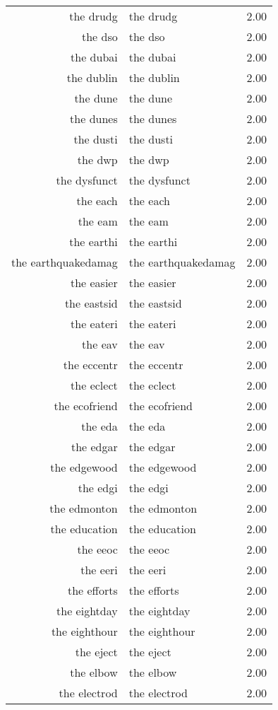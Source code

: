 \begin{table}[ht]
\begin{tabular}{rlr}
  the drudg & the drudg & 2.00 \\ 
  the dso & the dso & 2.00 \\ 
  the dubai & the dubai & 2.00 \\ 
  the dublin & the dublin & 2.00 \\ 
  the dune & the dune & 2.00 \\ 
  the dunes & the dunes & 2.00 \\ 
  the dusti & the dusti & 2.00 \\ 
  the dwp & the dwp & 2.00 \\ 
  the dysfunct & the dysfunct & 2.00 \\ 
  the each & the each & 2.00 \\ 
  the eam & the eam & 2.00 \\ 
  the earthi & the earthi & 2.00 \\ 
  the earthquakedamag & the earthquakedamag & 2.00 \\ 
  the easier & the easier & 2.00 \\ 
  the eastsid & the eastsid & 2.00 \\ 
  the eateri & the eateri & 2.00 \\ 
  the eav & the eav & 2.00 \\ 
  the eccentr & the eccentr & 2.00 \\ 
  the eclect & the eclect & 2.00 \\ 
  the ecofriend & the ecofriend & 2.00 \\ 
  the eda & the eda & 2.00 \\ 
  the edgar & the edgar & 2.00 \\ 
  the edgewood & the edgewood & 2.00 \\ 
  the edgi & the edgi & 2.00 \\ 
  the edmonton & the edmonton & 2.00 \\ 
  the education & the education & 2.00 \\ 
  the eeoc & the eeoc & 2.00 \\ 
  the eeri & the eeri & 2.00 \\ 
  the efforts & the efforts & 2.00 \\ 
  the eightday & the eightday & 2.00 \\ 
  the eighthour & the eighthour & 2.00 \\ 
  the eject & the eject & 2.00 \\ 
  the elbow & the elbow & 2.00 \\ 
  the electrod & the electrod & 2.00 \\ 

\end{tabular}
\end{table}
